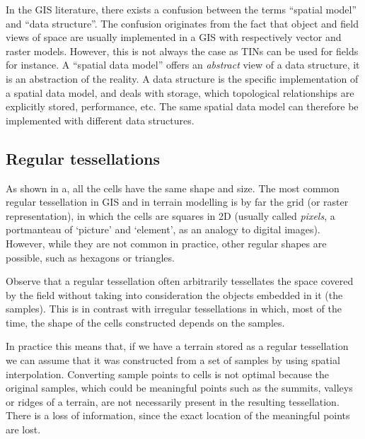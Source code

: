 In the GIS literature, there exists a confusion between the terms ``spatial model'' and ``data structure''. 
The confusion originates from the fact that object and field views of space are usually implemented in a GIS with respectively vector and raster models. 
However, this is not always the case as TINs can be used for fields for instance.
A ``spatial data model'' offers an \emph{abstract} view of a data structure, it is an abstraction of the reality.
A data structure is the specific implementation of a spatial data model, and deals with storage, which topological relationships are explicitly stored, performance, etc.
The same spatial data model can therefore be implemented with different data structures.



\subsection{Regular tessellations} 

As shown in a, all the cells have the same shape and size.
The most common regular tessellation in GIS and in terrain modelling is by far the grid (or raster representation), in which the cells are squares in 2D (usually called \emph{pixels}, a portmanteau of `picture' and `element', as an analogy to digital images).
However, while they are not common in practice, other regular shapes are possible, such as hexagons or triangles.

%

Observe that a regular tessellation often arbitrarily tessellates the space covered by the field without taking into consideration the objects embedded in it (the samples). 
This is in contrast with irregular tessellations in which, most of the time, the shape of the cells constructed depends on the samples.

In practice this means that, if we have a terrain stored as a regular tessellation we can assume that it was constructed from a set of samples by using spatial interpolation.
Converting sample points to cells is not optimal because the original samples, which could be meaningful points such as the summits, valleys or ridges of a terrain, are not necessarily present in the resulting tessellation. 
There is a loss of information, since the exact location of the meaningful points are lost.

